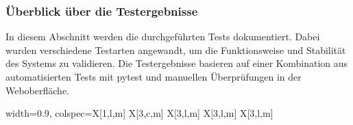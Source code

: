 \subsubsection{Überblick über die Testergebnisse}




In diesem Abschnitt werden die durchgeführten Tests dokumentiert.
Dabei wurden verschiedene Testarten angewandt, um die Funktionsweise und Stabilität des Systems zu validieren.
Die Testergebnisse basieren auf einer Kombination aus automatisierten Tests mit pytest und manuellen Überprüfungen in der Weboberfläche.

\footnotesize
\begin{center}
\begin{longtblr}[caption={Testfälle für die Hausverwaltungssoftware}, label={tab:testcases}]{width=0.9\textwidth, colspec={X[1,l,m] X[3,c,m] X[3,l,m] X[3,l,m] X[3,l,m]}}\toprule


\end{longtblr}
\end{center}
